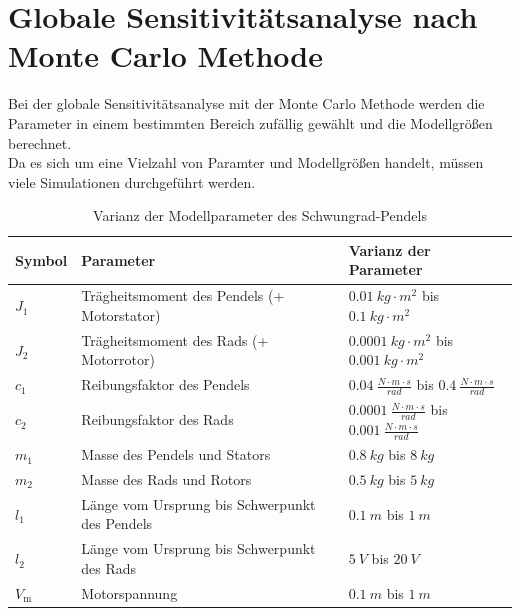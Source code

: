 \section{Globale Sensitivitätsanalyse nach Monte Carlo Methode}
Bei der globale Sensitivitätsanalyse mit der Monte Carlo Methode werden die Parameter in einem bestimmten Bereich zufällig gewählt und die Modellgrößen berechnet.\\
Da es sich um eine Vielzahl von Paramter und Modellgrößen handelt, müssen viele Simulationen durchgeführt werden.\\
\begin{table}[H]
    \centering
    \begin{tabular}{|lll|}
        \hline
        \rowcolor{grey}
        \textbf{Symbol}     & \textbf{Parameter}                                & \textbf{Varianz der Parameter}                         \\ \hline
        $J_{\mathrm{1}}$    & Trägheitsmoment des Pendels (+ Motorstator)       & $\SI{0.01}{kg \cdot m^2}$ bis $\SI{0.1}{kg \cdot m^2}$                  \\
        $J_{\mathrm{2}}$    & Trägheitsmoment des Rads (+ Motorrotor)           & $\SI{0.0001}{kg \cdot m^2} $ bis $\SI{0.001}{kg \cdot m^2}$               \\
        $c_{\mathrm{1}}$    & Reibungsfaktor des Pendels                        & $\SI{0.04}{\frac{N \cdot m \cdot s}{rad}}$ bis $\SI{0.4}{\frac{N \cdot m \cdot s}{rad}}$    \\
        $c_{\mathrm{2}}$    & Reibungsfaktor des Rads                           & $\SI{0.0001}{\frac{N \cdot m \cdot s}{rad}}$ bis $\SI{0.001}{\frac{N \cdot m \cdot s}{rad}}$  \\
        $m_{\mathrm{1}}$    & Masse des Pendels und Stators                     & $\SI{0.8}{kg}$ bis $\SI{8}{kg}$                              \\
        $m_{\mathrm{2}}$    & Masse des Rads und Rotors                         & $\SI{0.5}{kg}$ bis $\SI{5}{kg}$                              \\
        $l_{\mathrm{1}}$    & Länge vom Ursprung bis Schwerpunkt des Pendels    & $\SI{0.1}{m}$ bis $\SI{1}{m}$                              \\
        $l_{\mathrm{2}}$    & Länge vom Ursprung bis Schwerpunkt des Rads       & $\SI{5}{V}$ bis $\SI{20}{V}$  \\
        $V_{\mathrm{m}}$    & Motorspannung       & $\SI{0.1}{m}$ bis $\SI{1}{m}$                                \\ \hline
    \end{tabular}
    \caption{Varianz der Modellparameter des Schwungrad-Pendels}
    \label{tab:varianz_parameter}
\end{table}

